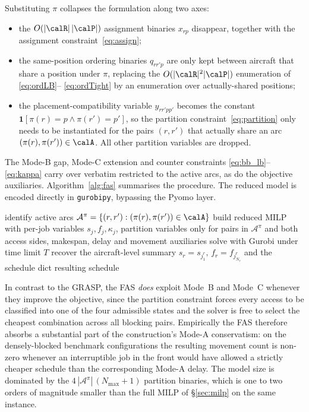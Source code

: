 Substituting $\pi$ collapses the formulation along two axes:
\begin{itemize}[leftmargin=2em, itemsep=0pt]
  \item the $O(|\calR|\,|\calP|)$ assignment binaries
        $x_{rp}$ disappear, together with the assignment
        constraint~\eqref{eq:assign};
  \item the same-position ordering binaries $q_{rr'p}$ are only kept
        between aircraft that share a position under $\pi$, replacing
        the $O(|\calR|^2 |\calP|)$ enumeration of \eqref{eq:ordLB}--%
        \eqref{eq:ordTight} by an enumeration over actually-shared
        positions;
  \item the placement-compatibility variable $y_{rr'pp'}$ becomes the
        constant $\mathbf{1}[\pi(r){=}p \wedge \pi(r'){=}p']$, so the
        partition constraint~\eqref{eq:partition} only needs to be
        instantiated for the pairs $(r, r')$ that actually share an
        arc $(\pi(r), \pi(r')) \in \calA$.  All other partition
        variables are dropped.
\end{itemize}
The Mode-B gap, Mode-C extension and counter constraints
\eqref{eq:bb_lb}--\eqref{eq:kappa} carry over verbatim restricted to the
active arcs, as do the objective auxiliaries.
Algorithm~\ref{alg:fas} summarises the procedure.  The reduced model is
encoded directly in \texttt{gurobipy}, bypassing the Pyomo layer.

\begin{algorithm}[htbp]
\DontPrintSemicolon
{}
identify active arcs
   $\mathcal{A}^{\pi} = \{(r, r') : (\pi(r), \pi(r')) \in \calA\}$\;
build reduced MILP with per-job variables $s_j, f_j, \kappa_j$,
   partition variables only for pairs in $\mathcal{A}^{\pi}$ and both
   access sides, makespan, delay and movement auxiliaries\;
solve with Gurobi under time limit $T$\;
recover the aircraft-level summary
   $s_r \!=\! s_{j^r_1},\, f_r \!=\! f_{j^r_{N_r}}$
   and the schedule dict\;
\Return resulting schedule\;
\caption{Fixed-Assignment Scheduler (FAS) for the job-level problem.}
\label{alg:fas}
\end{algorithm}

In contrast to the GRASP, the FAS \emph{does} exploit Mode~B and
Mode~C whenever they improve the objective, since the partition
constraint forces every access to be classified into one of the four
admissible states and the solver is free to select the cheapest
combination across all blocking pairs.  Empirically the FAS therefore
absorbs a substantial part of the construction's Mode-A conservatism:
on the densely-blocked benchmark configurations the resulting movement
count is non-zero whenever an interruptible job in the front would
have allowed a strictly cheaper schedule than the corresponding Mode-A
delay.  The model size is dominated by the $4\,|\mathcal{A}^{\pi}|\,
(N_{\max}+1)$ partition binaries, which is one to two orders of
magnitude smaller than the full MILP of \S\ref{sec:milp} on the same
instance.


